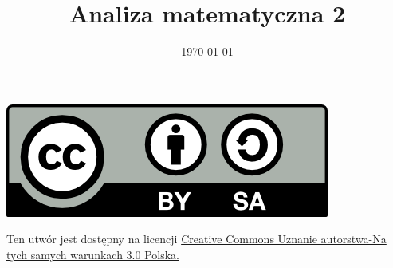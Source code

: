\documentclass[12pt,a4paper]{article}
\theoremstyle{definition}
\begin{document}
\title{ Analiza matematyczna 2}
\author{\vspace{-5ex}}
\date{\today}
\maketitle
\tableofcontents

\begin{center}
\leavevmode

\includegraphics[width=1 in]{by-sa.png}
\end{center}
\label{fig:cc}
\scriptsize{Ten utwór jest dostępny na licencji  \href{http://creativecommons.org/licenses/by-sa/3.0/pl/}{Creative Commons Uznanie autorstwa-Na tych samych warunkach 3.0 Polska.}}


\pagebreak
\end{document}

